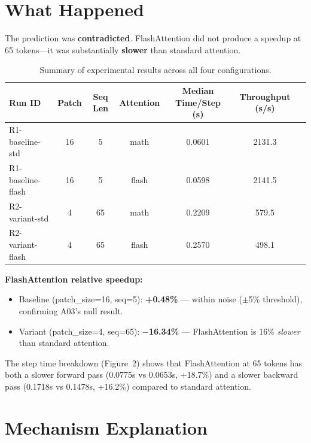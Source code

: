 \documentclass[12pt, a4paper]{article}
\begin{document}
\section{What Happened}

The prediction was \textbf{contradicted}. FlashAttention did not produce a speedup at 65 tokens---it was substantially \textbf{slower} than standard attention.

\begin{table}[h]
\centering
\caption{Summary of experimental results across all four configurations.}
\label{tab:results}
\begin{tabular}{lcccccc}
\toprule
\textbf{Run ID} & \textbf{Patch} & \textbf{Seq Len} & \textbf{Attention} & \textbf{Median Time/Step (s)} & \textbf{Throughput (s/s)} \\
\midrule
R1-baseline-std   & 16 & 5  & math  & 0.0601 & 2131.3 \\
R1-baseline-flash & 16 & 5  & flash & 0.0598 & 2141.5 \\
R2-variant-std    & 4  & 65 & math  & 0.2209 & 579.5  \\
R2-variant-flash  & 4  & 65 & flash & 0.2570 & 498.1  \\
\bottomrule
\end{tabular}
\end{table}

\textbf{FlashAttention relative speedup:}
\begin{itemize}
    \item Baseline (patch\_size=16, seq=5): \textbf{+0.48\%} --- within noise ($\pm$5\% threshold), confirming A03's null result.
    \item Variant (patch\_size=4, seq=65): \textbf{$-$16.34\%} --- FlashAttention is 16\% \textit{slower} than standard attention.
\end{itemize}

The step time breakdown (Figure~2) shows that FlashAttention at 65 tokens has both a slower forward pass (0.0775s vs 0.0653s, +18.7\%) and a slower backward pass (0.1718s vs 0.1478s, +16.2\%) compared to standard attention.

\section{Mechanism Explanation}
\end{document}
